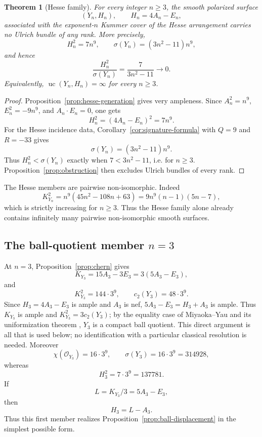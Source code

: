 \documentclass[11pt]{article}
\newtheorem{theorem}{Theorem}[section]
\newcommand{\OO}{\mathcal O}
\newcommand{\sig}{\sigma}
\newcommand{\uc}{\operatorname{uc}}
\begin{document}
\begin{theorem}[Hesse family]\label{thm:hesse-family}
For every integer $n\ge3$, the smooth polarized surface
\[
        (Y_n,H_n),\qquad H_n=4A_n-E_n,
\]
associated with the exponent-$n$ Kummer cover of the Hesse arrangement carries
no Ulrich bundle of any rank.  More precisely,
\begin{equation}\label{eq:hesse-numerics}
        H_n^2=7n^9,
        \qquad
        \sig(Y_n)=(3n^2-11)n^9,
\end{equation}
and hence
\begin{equation}\label{eq:hesse-ratio}
        \frac{H_n^2}{\sig(Y_n)}=\frac7{3n^2-11}\longrightarrow0.
\end{equation}
Equivalently, $\uc(Y_n,H_n)=\infty$ for every $n\ge3$.
\end{theorem}

\begin{proof}
Proposition~\ref{prop:hesse-generation} gives very ampleness.  Since
$A_n^2=n^9$, $E_n^2=-9n^9$, and $A_n\cdot E_n=0$, one gets
\[
        H_n^2=(4A_n-E_n)^2=7n^9.
\]
For the Hesse incidence data, Corollary~\ref{cor:signature-formula} with
$Q=9$ and $R=-33$ gives
\[
        \sig(Y_n)=(3n^2-11)n^9.
\]
Thus $H_n^2<\sig(Y_n)$ exactly when $7<3n^2-11$, i.e. for $n\ge3$.
Proposition~\ref{prop:obstruction} then excludes Ulrich bundles of every rank.
\end{proof}

The Hesse members are pairwise non-isomorphic.  Indeed
\begin{equation}\label{eq:hesse-K2-growth}
 K_{Y_n}^2=n^9(45n^2-108n+63)
           =9n^9(n-1)(5n-7),
\end{equation}
which is strictly increasing for $n\ge3$.  Thus the Hesse family alone already
contains infinitely many pairwise non-isomorphic smooth surfaces.

\subsection{\texorpdfstring{The ball-quotient member $n=3$}{The ball-quotient member n=3}}

At $n=3$, Proposition~\ref{prop:chern} gives
\[
        K_{Y_3}=15A_3-3E_3=3(5A_3-E_3),
\]
and
\[
        K_{Y_3}^2=144\cdot3^9,
        \qquad
        c_2(Y_3)=48\cdot3^9.
\]
Since $H_3=4A_3-E_3$ is ample and $A_3$ is nef,
$5A_3-E_3=H_3+A_3$ is ample.  Thus $K_{Y_3}$ is ample and
$K_{Y_3}^2=3c_2(Y_3)$; by the equality case of Miyaoka--Yau and its uniformization theorem
\cite{Miyaoka1977,Yau1977,GrebKebekusPeternellTaji}, $Y_3$ is a compact ball quotient.  This direct
argument is all that is used below; no identification with a particular
classical resolution is needed.  Moreover
\[
        \chi(\OO_{Y_3})=16\cdot3^9,
        \qquad
        \sig(Y_3)=16\cdot3^9=314928,
\]
whereas
\[
        H_3^2=7\cdot3^9=137781.
\]
If
\[
        L=K_{Y_3}/3=5A_3-E_3,
\]
then
\[
        H_3=L-A_3.
\]
Thus this first member realizes Proposition~\ref{prop:ball-displacement} in the
simplest possible form.
\end{document}
